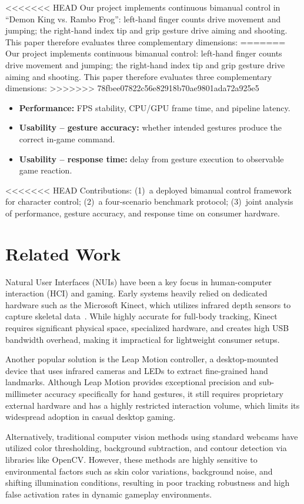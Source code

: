 \documentclass[journal,onecolumn,12pt,draftclsnofoot]{IEEEtran}
\begin{document}
<<<<<<< HEAD
Our project implements continuous bimanual control in ``Demon King vs. Rambo Frog'': left-hand finger counts drive movement and jumping; the right-hand index tip and grip gesture drive aiming and shooting. This paper therefore evaluates three complementary dimensions:
=======
Our project implements continuous bimanual control: left-hand finger counts drive movement and jumping; the right-hand index tip and grip gesture drive aiming and shooting. This paper therefore evaluates three complementary dimensions:
>>>>>>> 78fbee07822c56e82918b70ae9801ada72a925e5
\begin{itemize}
\item \textbf{Performance:} FPS stability, CPU/GPU frame time, and pipeline latency.
\item \textbf{Usability -- gesture accuracy:} whether intended gestures produce the correct in-game command.
\item \textbf{Usability -- response time:} delay from gesture execution to observable game reaction.
\end{itemize}

<<<<<<< HEAD
Contributions: (1)~a deployed bimanual control framework for character control; (2)~a four-scenario benchmark protocol; (3)~joint analysis of performance, gesture accuracy, and response time on consumer hardware.

\section{Related Work}
Natural User Interfaces (NUIs) have been a key focus in human-computer interaction (HCI) and gaming. Early systems heavily relied on dedicated hardware such as the Microsoft Kinect, which utilizes infrared depth sensors to capture skeletal data~\cite{b4}. While highly accurate for full-body tracking, Kinect requires significant physical space, specialized hardware, and creates high USB bandwidth overhead, making it impractical for lightweight consumer setups.

Another popular solution is the Leap Motion controller, a desktop-mounted device that uses infrared cameras and LEDs to extract fine-grained hand landmarks. Although Leap Motion provides exceptional precision and sub-millimeter accuracy specifically for hand gestures, it still requires proprietary external hardware and has a highly restricted interaction volume, which limits its widespread adoption in casual desktop gaming.

Alternatively, traditional computer vision methods using standard webcams have utilized color thresholding, background subtraction, and contour detection via libraries like OpenCV. However, these methods are highly sensitive to environmental factors such as skin color variations, background noise, and shifting illumination conditions, resulting in poor tracking robustness and high false activation rates in dynamic gameplay environments.
\end{document}
